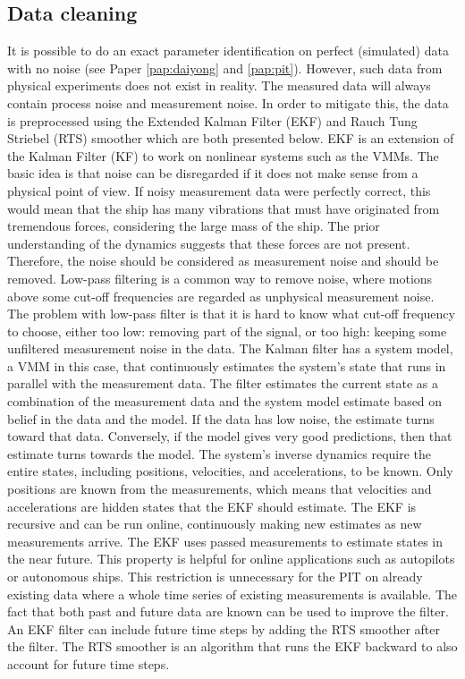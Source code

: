 \subsection{Data cleaning}
\label{sec:datacleaning}
It is possible to do an exact parameter identification on perfect (simulated) data with no noise (see Paper \ref{pap:daiyong} and \ref{pap:pit}). However, such data from physical experiments does not exist in reality. The measured data will always contain process noise and measurement noise. In order to mitigate this, the data is preprocessed using the Extended Kalman Filter (EKF) \cite{brown_introduction_1997} and Rauch Tung Striebel (RTS) smoother \cite{rauch_maximum_1965} which are both presented below.
EKF is an extension of the Kalman Filter (KF) to work on nonlinear systems such as the VMMs. The basic idea is that noise can be disregarded if it does not make sense from a physical point of view. If noisy measurement data were perfectly correct, this would mean that the ship has many vibrations that must have originated from tremendous forces, considering the large mass of the ship. The prior understanding of the dynamics suggests that these forces are not present. Therefore, the noise should be considered as measurement noise and should be removed. Low-pass filtering is a common way to remove noise, where motions above some cut-off frequencies are regarded as unphysical measurement noise. The problem with low-pass filter is that it is hard to know what cut-off frequency to choose, either too low: removing part of the signal, or too high: keeping some unfiltered measurement noise in the data. The Kalman filter has a system model, a VMM in this case, that continuously estimates the system’s state that runs in parallel with the measurement data. The filter estimates the current state as a combination of the measurement data and the system model estimate based on belief in the data and the model. If the data has low noise, the estimate turns toward that data. Conversely, if the model gives very good predictions, then that estimate turns towards the model.
The system’s inverse dynamics require the entire states, including positions, velocities, and accelerations, to be known. Only positions are known from the measurements, which means that velocities and accelerations are hidden states that the EKF should estimate.
The EKF is recursive and can be run online, continuously making new estimates as new measurements arrive. The EKF uses passed measurements to estimate states in the near future. This property is helpful for online applications such as  autopilots or autonomous ships. This restriction is  unnecessary for the PIT on already existing data where a whole time series of existing measurements is available. The fact that both past and future data are known can be used to improve the filter. An EKF filter can include future time steps by adding the RTS smoother after the filter. The RTS smoother is an algorithm that runs the EKF backward to also account for future time steps.



